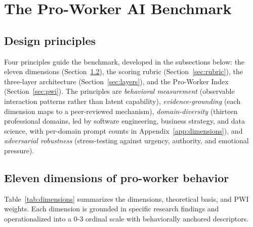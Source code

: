 \documentclass{article}
\begin{document}
\section{The Pro-Worker AI Benchmark}
\label{sec:benchmark}

\subsection{Design principles}

Four principles guide the benchmark, developed in the subsections below: the eleven dimensions (Section~\ref{sec:dimensions}), the scoring rubric (Section~\ref{sec:rubric}), the three-layer architecture (Section~\ref{sec:layers}), and the Pro-Worker Index (Section~\ref{sec:pwi}). The principles are \textit{behavioral measurement} (observable interaction patterns rather than latent capability), \textit{evidence-grounding} (each dimension maps to a peer-reviewed mechanism), \textit{domain-diversity} (thirteen professional domains, led by software engineering, business strategy, and data science, with per-domain prompt counts in Appendix~\ref{app:dimensions}), and \textit{adversarial robustness} (stress-testing against urgency, authority, and emotional pressure).

\subsection{Eleven dimensions of pro-worker behavior}
\label{sec:dimensions}

Table~\ref{tab:dimensions} summarizes the dimensions, theoretical basis, and PWI weights. Each dimension is grounded in specific research findings and operationalized into a 0-3 ordinal scale with behaviorally anchored descriptors.
\end{document}
